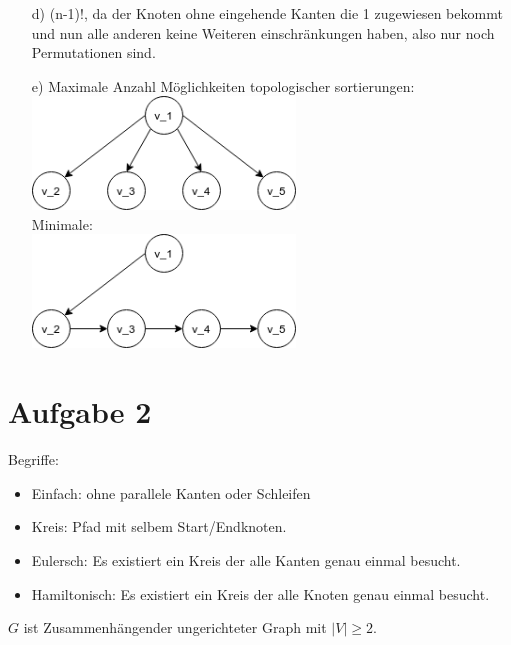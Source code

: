 \documentclass{scrartcl}
\begin{document}
\begin{itemize}
    \item[d)] (n-1)!, da der Knoten ohne eingehende Kanten die 1 zugewiesen
        bekommt und nun alle anderen keine Weiteren einschränkungen haben, also
        nur noch Permutationen sind.
    \item[e)] Maximale Anzahl Möglichkeiten topologischer sortierungen: \\
        \includegraphics[width=7cm]{max_top.png} \\
        Minimale: \\
        \includegraphics[width=7cm]{min_top.png}

\end{itemize}



\section*{Aufgabe 2}
Begriffe:
\begin{itemize}
    \item Einfach: ohne parallele Kanten oder Schleifen
    \item Kreis: Pfad mit selbem Start/Endknoten.
    \item {\color{blue} Eulersch}:  Es existiert ein Kreis der alle Kanten genau einmal besucht.
    \item {\color{ForestGreen} Hamiltonisch}: Es existiert ein Kreis der alle Knoten genau einmal besucht.
\end{itemize}

$G$ ist Zusammenhängender ungerichteter Graph mit $|V| \geq 2$.
\end{document}
